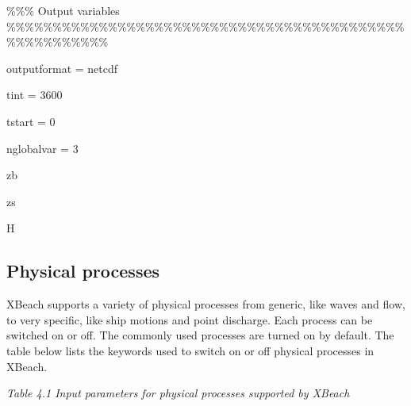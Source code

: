 \documentclass{article}
\begin{document}
\noindent 

\noindent \%\%\% Output variables \%\%\%\%\%\%\%\%\%\%\%\%\%\%\%\%\%\%\%\%\%\%\%\%\%\%\%\%\%\%\%\%\%\%\%\%\%\%\%\%\%\%\%\%\%\%\%\%\%\%\%\%\%\%

\noindent 

\noindent outputformat = netcdf

\noindent tint         = 3600

\noindent tstart       = 0

\noindent 

\noindent nglobalvar   = 3

\noindent zb

\noindent zs

\noindent H


\subsection{ Physical processes}

\noindent XBeach supports a variety of physical processes from generic, like waves and flow, to very specific, like ship motions and point discharge. Each process can be switched on or off. The commonly used processes are turned on by default. The table below lists the keywords used to switch on or off physical processes in XBeach.

\noindent \textit{Table 4.1 Input parameters for physical processes supported by XBeach}
\end{document}
